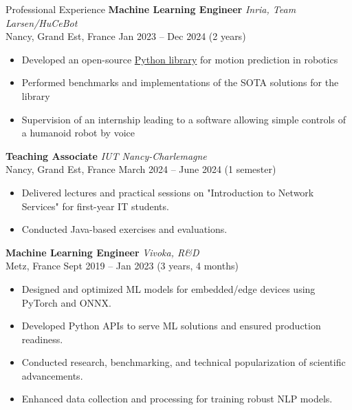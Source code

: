 \documentclass{resume} %
\begin{document}
 \begin{rSection}{Professional Experience}
\textbf{Machine Learning Engineer} \hfill \textit{Inria, Team Larsen/HuCeBot} \\
Nancy, Grand Est, France \hfill Jan 2023 -- Dec 2024 (2 years)
\begin{itemize}
    \item Developed an open-source \href{https://github.com/hucebot/prescyent}{Python library} for motion prediction in robotics
       \item Performed benchmarks and implementations of the SOTA solutions for the library
      \item Supervision of an internship leading to a software allowing simple controls of a humanoid robot by voice
\end{itemize}

\vspace{0.2cm}

\textbf{Teaching Associate} \hfill \textit{IUT Nancy-Charlemagne} \\
Nancy, Grand Est, France \hfill March 2024 -- June 2024  (1 semester)
\begin{itemize}
    \item Delivered lectures and practical sessions on "Introduction to Network Services" for first-year IT students.
    \item Conducted Java-based exercises and evaluations.
\end{itemize}

\vspace{0.2cm}

\textbf{Machine Learning Engineer} \hfill \textit{Vivoka, R\&D} \\
Metz, France \hfill Sept 2019 -- Jan 2023 (3 years, 4 months)
\begin{itemize}
    \item Designed and optimized ML models for embedded/edge devices using PyTorch and ONNX.
    \item Developed Python APIs to serve ML solutions and ensured production readiness.
    \item Conducted research, benchmarking, and technical popularization of scientific advancements.
    \item Enhanced data collection and processing for training robust NLP models.
\end{itemize}

\vspace{0.2cm}


\end{rSection}
\end{document}
